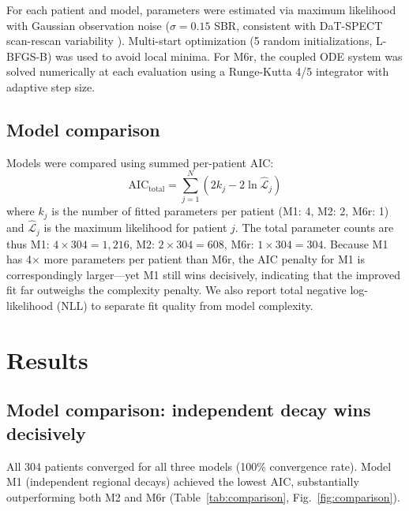 For each patient and model, parameters were estimated via maximum likelihood with Gaussian observation noise ($\sigma = 0.15$ SBR, consistent with DaT-SPECT scan-rescan variability \cite{tossicibolt2017}). Multi-start optimization (5 random initializations, L-BFGS-B) was used to avoid local minima. For M6r, the coupled ODE system was solved numerically at each evaluation using a Runge-Kutta 4/5 integrator with adaptive step size.

\subsection{Model comparison}

Models were compared using summed per-patient AIC:
\begin{equation}
\text{AIC}_{\text{total}} = \sum_{j=1}^{N} \left( 2 k_j - 2 \ln \hat{\mathcal{L}}_j \right)
\end{equation}
where $k_j$ is the number of fitted parameters per patient (M1: 4, M2: 2, M6r: 1) and $\hat{\mathcal{L}}_j$ is the maximum likelihood for patient $j$. The total parameter counts are thus M1: $4 \times 304 = 1{,}216$, M2: $2 \times 304 = 608$, M6r: $1 \times 304 = 304$. Because M1 has 4$\times$ more parameters per patient than M6r, the AIC penalty for M1 is correspondingly larger---yet M1 still wins decisively, indicating that the improved fit far outweighs the complexity penalty. We also report total negative log-likelihood (NLL) to separate fit quality from model complexity.

\section{Results}

\subsection{Model comparison: independent decay wins decisively}

All 304 patients converged for all three models (100\% convergence rate). Model M1 (independent regional decays) achieved the lowest AIC, substantially outperforming both M2 and M6r (Table~\ref{tab:comparison}, Fig.~\ref{fig:comparison}).

